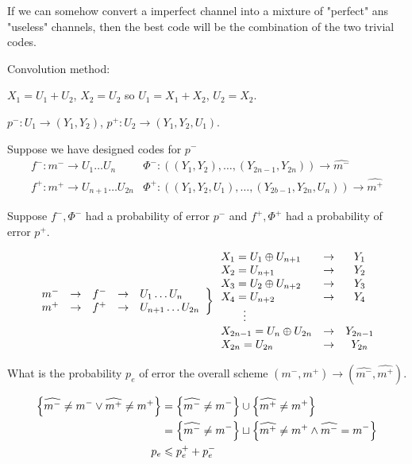 If we can somehow convert a imperfect channel into a mixture of "perfect" ans "useless" channels, then the best code will be the combination of the two trivial codes.

Convolution method:

$X_1 = U_1+U_2$, $X_2 = U_2$ so $U_1 = X_1+X_2$, $U_2 = X_2$.

$p^-: U_1 \to (Y_1,Y_2)$, $p^+:U_2\to(Y_1,Y_2,U_1)$.

Suppose we have designed codes for $p^-$
\[
    \begin{array}{ll}
        f^- : m^- \to U_1\ldots U_n & \Phi^- : ((Y_1,Y_2),\ldots,(Y_{2n-1},Y_{2n})) \to \widehat{m^-}\\
        f^+ : m^+ \to U_{n+1}\ldots U_{2n} & \Phi^+ : ((Y_1,Y_2,U_1),\ldots,(Y_{2b-1},Y_{2n},U_n)) \to \widehat{m^+}
    \end{array}
\]

Suppose $f^-, \Phi^-$ had a probability of error $p^-$ 
and $f^+, \Phi^+$ had a probability of error $p^+$.

\[
    \left.
    \begin{array}{lclcl}
        m^- & \rightarrow & f^- & \rightarrow & U_1\ldots U_n\\
        m^+ & \rightarrow & f^+ & \rightarrow & U_{n+1}\ldots U_{2n}
    \end{array}\right\rbrace
    \begin{array}{lcc}
        X_1 = U_1\oplus U_{n+1} & \rightarrow & Y_1\\
        X_2 = U_{n+1} & \rightarrow & Y_2\\
        X_3 = U_2\oplus U_{n+2} & \rightarrow & Y_3\\
        X_4 = U_{n+2} & \rightarrow & Y_4\\
        \qquad \vdots\\
        X_{2n-1} = U_n\oplus U_{2n} & \rightarrow & Y_{2n-1}\\
        X_{2n} = U_{2n} & \rightarrow & Y_{2n}\\
    \end{array}
\]

What is the probability $p_e$ of error the overall scheme $(m^-,m^+) \to (\widehat{m^-},\widehat{m^+})$.

\[
    \begin{aligned}
        \left\{ \widehat{m^-} \neq m^- \vee \widehat{m^+}\neq m^+ \right\} &= \left\{ \widehat{m^-} \neq m^- \right\} \cup \left\{ \widehat{m^+}\neq m^+ \right\}\\
        &= \left\{ \widehat{m^-} \neq m^- \right\} \sqcup \left\{ \widehat{m^+}\neq m^+ \wedge \widehat{m^-} = m^- \right\}\\
        p_e &\leqslant p_e^+ + p_e^-
    \end{aligned}
\]

